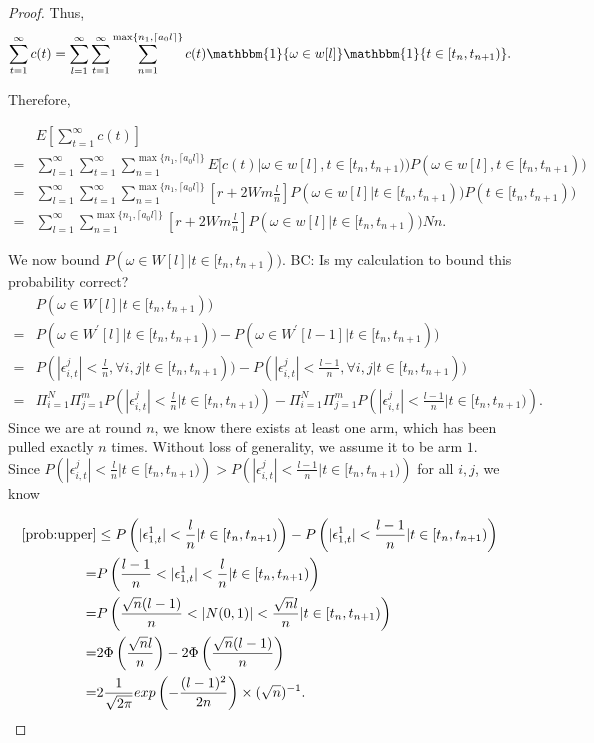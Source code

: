 \documentclass{article}
\newcommand{\bccomment}[1]{{\color{blue}BC: #1}}
\begin{document}
\begin{proof}
Thus,
\begin{align}
\sum_{t=1}^{\infty}c(t)=\sum_{l=1}^{\infty}\sum_{t=1}^{\infty}\sum_{n=1}^{\max\{n_1,\lceil a_0 l\rceil\}}c(t)\mathbbm{1}\{\omega\in w[l]\}\mathbbm{1}\{t\in [t_n,t_{n+1})\}. \nonumber
\end{align}

Therefore,

\begin{align}
&E\left[\sum_{t=1}^{\infty}c(t)\right] \nonumber\\
=&\sum_{l=1}^{\infty}\sum_{t=1}^{\infty}\sum_{n=1}^{\max\{n_1,\lceil a_0 l\rceil\}}E[c(t)|\omega \in w[l],t\in [t_n,t_{n+1}))P(\omega\in w[l],t\in [t_n,t_{n+1})) \nonumber \\
=&\sum_{l=1}^{\infty}\sum_{t=1}^{\infty}\sum_{n=1}^{\max\{n_1,\lceil a_0 l\rceil\}}\left[r+2Wm\frac{l}{n}\right]P(\omega\in w[l]|t\in [t_n,t_{n+1}))P(t\in [t_n,t_{n+1})) \nonumber \\
=&\sum_{l=1}^{\infty}\sum_{n=1}^{\max\{n_1,\lceil a_0 l\rceil\}}\left[r+2Wm\frac{l}{n}\right]P(\omega\in w[l]|t\in [t_n,t_{n+1}))Nn. \nonumber
\end{align}

We now bound $P(\omega\in W[l]|t\in[t_{n},t_{n+1}))$. \bccomment{Is my calculation to bound this probability correct?}
\begin{align}
&P(\omega\in W[l]|t\in[t_{n},t_{n+1})) \nonumber \\
=&P(\omega\in W^{'}[l]|t\in[t_{n},t_{n+1}))- P(\omega\in W^{'}[l-1]|t\in[t_{n},t_{n+1})) \nonumber \\
=&P(|\epsilon_{i,t}^{j}|<\frac{l}{n}, \forall i,j|t\in[t_n,t_{n+1}))-P(|\epsilon_{i,t}^{j}|<\frac{l-1}{n}, \forall i,j|t\in[t_n,t_{n+1})) \nonumber \\
=&\Pi_{i=1}^{N}\Pi_{j=1}^{m}P\left(|\epsilon_{i,t}^{j}|<\frac{l}{n}|t\in[t_n,t_{n+1})\right)-\Pi_{i=1}^{N}\Pi_{j=1}^{m}P\left(|\epsilon_{i,t}^{j}|<\frac{l-1}{n}|t\in[t_n,t_{n+1})\right). \label{prob:upper}
\end{align}
Since we are at round $n$, we know there exists at least one arm, which has been pulled exactly $n$ times. Without loss of generality, we assume it to be arm $1$. Since $P\left(|\epsilon_{i,t}^{j}|<\frac{l}{n}|t\in[t_n,t_{n+1})\right)> P\left(|\epsilon_{i,t}^{j}|<\frac{l-1}{n}|t\in[t_n,t_{n+1})\right)$ for all $i,j$, we know

\begin{align}
\eqref{prob:upper}&\leq P\left(|\epsilon_{1,t}^{1}|<\frac{l}{n}|t\in[t_n,t_{n+1})\right)-P\left(|\epsilon_{1,t}^{1}|<\frac{l-1}{n}|t\in[t_n,t_{n+1})\right) \nonumber \\
=&P\left(\frac{l-1}{n}<|\epsilon_{1,t}^{1}|<\frac{l}{n}|t\in[t_n,t_{n+1})\right) \nonumber \\
=&P\left(\frac{\sqrt{n}(l-1)}{n}<|N(0,1)|<\frac{\sqrt{n}l}{n}|t\in[t_n,t_{n+1})\right) \nonumber \\
=&2\Phi\left(\frac{\sqrt{n}l}{n}\right)-2\Phi\left(\frac{\sqrt{n}(l-1)}{n}\right) \nonumber \\
=&2 \frac{1}{\sqrt{2\pi}}exp\left(-\frac{(l-1)^2}{2n}\right)\times (\sqrt{n})^{-1}. \nonumber
\end{align}


\end{proof}
\end{document}
